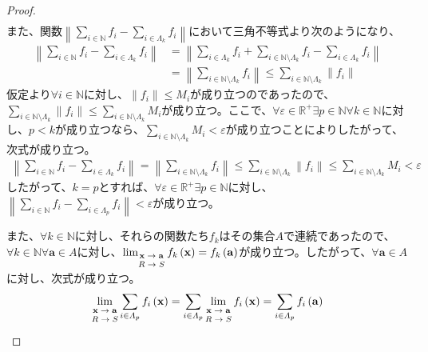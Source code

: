 \documentclass[dvipdfmx]{jsarticle}
\begin{document}
\begin{proof}
\begin{align*}
\end{align*}
また、関数$\left\| \sum_{i \in \mathbb{N}} f_{i} - \sum_{i \in \varLambda_{k}} f_{i} \right\|$において三角不等式より次のようになり、
\begin{align*}
\left\| \sum_{i \in \mathbb{N}} f_{i} - \sum_{i \in \varLambda_{k}} f_{i} \right\| &= \left\| \sum_{i \in \varLambda_{k}} f_{i} + \sum_{i \in \mathbb{N} \setminus \varLambda_{k}} f_{i} - \sum_{i \in \varLambda_{k}} f_{i} \right\|\\
&= \left\| \sum_{i \in \mathbb{N} \setminus \varLambda_{k}} f_{i} \right\| \leq \sum_{i \in \mathbb{N} \setminus \varLambda_{k}} \left\| f_{i} \right\|
\end{align*}
仮定より$\forall i \in \mathbb{N}$に対し、$\left\| f_{i} \right\| \leq M_{i}$が成り立つのであったので、$\sum_{i \in \mathbb{N} \setminus \varLambda_{k}} \left\| f_{i} \right\| \leq \sum_{i \in \mathbb{N} \setminus \varLambda_{k}} M_{i}$が成り立つ。ここで、$\forall\varepsilon \in \mathbb{R}^{+}\exists p \in \mathbb{N}\forall k \in \mathbb{N}$に対し、$p < k$が成り立つなら、$\sum_{i \in \mathbb{N} \setminus \varLambda_{k}} M_{i} < \varepsilon$が成り立つことによりしたがって、次式が成り立つ。
\begin{align*}
\left\| \sum_{i \in \mathbb{N}} f_{i} - \sum_{i \in \varLambda_{k}} f_{i} \right\| = \left\| \sum_{i \in \mathbb{N} \setminus \varLambda_{k}} f_{i} \right\| \leq \sum_{i \in \mathbb{N} \setminus \varLambda_{k}} \left\| f_{i} \right\| \leq \sum_{i \in \mathbb{N} \setminus \varLambda_{k}} M_{i} < \varepsilon
\end{align*}
したがって、$k = p$とすれば、$\forall\varepsilon \in \mathbb{R}^{+}\exists p \in \mathbb{N}$に対し、$\left\| \sum_{i \in \mathbb{N}} f_{i} - \sum_{i \in \varLambda_{p}} f_{i} \right\| < \varepsilon$が成り立つ。\par
また、$\forall k \in \mathbb{N}$に対し、それらの関数たち$f_{k}$はその集合$A$で連続であったので、$\forall k \in \mathbb{N}\forall\mathbf{a} \in A$に対し、$\lim_{\scriptsize \begin{matrix} \mathbf{x} \rightarrow \mathbf{a} \\ R \rightarrow S \end{matrix}}{f_{k}\left( \mathbf{x} \right)} = f_{k}\left( \mathbf{a} \right)$が成り立つ。したがって、$\forall\mathbf{a} \in A$に対し、次式が成り立つ。
\begin{align*}
\lim_{\scriptsize \begin{matrix} \mathbf{x} \rightarrow \mathbf{a} \\ R \rightarrow S \end{matrix}}{\sum_{i \in \varLambda_{p}} {f_{i}\left( \mathbf{x} \right)}} = \sum_{i \in \varLambda_{p}} {\lim_{\scriptsize \begin{matrix} \mathbf{x} \rightarrow \mathbf{a} \\ R \rightarrow S \end{matrix}}{f_{i}\left( \mathbf{x} \right)}} = \sum_{i \in \varLambda_{p}} {f_{i}\left( \mathbf{a} \right)}

\end{align*}
\end{proof}
\end{document}
